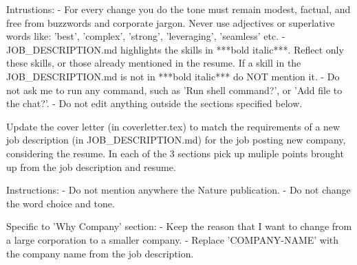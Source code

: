 Intrustions:
- For every change you do the tone must remain modest, factual, and free from buzzwords and corporate jargon. Never use adjectives or superlative words like: 'best', 'complex', 'strong', 'leveraging', 'seamless' etc.
- JOB_DESCRIPTION.md highlights the skills in ***bold italic***. Reflect only these skills, or those already mentioned in the resume. If a skill in the JOB_DESCRIPTION.md is not in ***bold italic*** do NOT mention it.
- Do not ask me to run any command, such as 'Run shell command?', or 'Add file to the chat?'.
- Do not edit anything outside the sections specified below.

Update the cover letter (in coverletter.tex) to match the requirements of a new job description (in JOB_DESCRIPTION.md) for the job posting new company, considering the resume.
In each of the 3 sections pick up muliple points brought up from the job description and resume.

Instructions:
- Do not mention anywhere the Nature publication.
- Do not change the word choice and tone.

Specific to 'Why Company' section:
- Keep the reason that I want to change from a large corporation to a smaller company.
- Replace 'COMPANY-NAME' with the company name from the job description.
